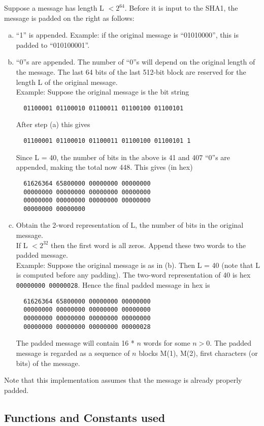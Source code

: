 Suppose a message has length L $< 2^{64}$. Before it is input to the
SHA1, the message is padded on the right as follows:
\begin{enumerate}[a.]
\item ``1'' is appended. Example: if the original message is ``01010000'',
this is padded to ``010100001''.
\item ``0''s are appended. The number of ``0''s will depend on the
original length of the message. The last 64 bits of the last 512-bit
block are reserved for the length L of the original message.\\
Example: Suppose the original message is the bit string
\begin{verbatim}
  01100001 01100010 01100011 01100100 01100101
\end{verbatim}
After step (a) this gives
\begin{verbatim}
  01100001 01100010 01100011 01100100 01100101 1
\end{verbatim}
Since L = 40, the number of bits in the above is 41 and 407 ``0''s are
appended, making the total now 448. This gives (in hex)
\begin{verbatim}
  61626364 65800000 00000000 00000000
  00000000 00000000 00000000 00000000
  00000000 00000000 00000000 00000000
  00000000 00000000 
\end{verbatim}
\item Obtain the 2-word representation of L, the number of bits in the
original message.\\
If L $< 2^{32}$ then the first word is all zeros. Append
these two words to the padded message.\\
Example: Suppose the original message is as in (b). Then L = 40 (note that
L is computed before any padding). The two-word representation of 40 is
hex \verb|00000000 00000028|. Hence the final padded message in hex is
\begin{verbatim}
  61626364 65800000 00000000 00000000
  00000000 00000000 00000000 00000000
  00000000 00000000 00000000 00000000
  00000000 00000000 00000000 00000028
\end{verbatim}
The padded message will contain 16 * $n$ words for some $n > 0$. 
The padded message is regarded as a sequence of $n$ blocks M(1),
M(2), first characters (or bits) of the message.
\end{enumerate}

Note that this implementation assumes that the message is already
properly padded.

\subsection{Functions and Constants used}

